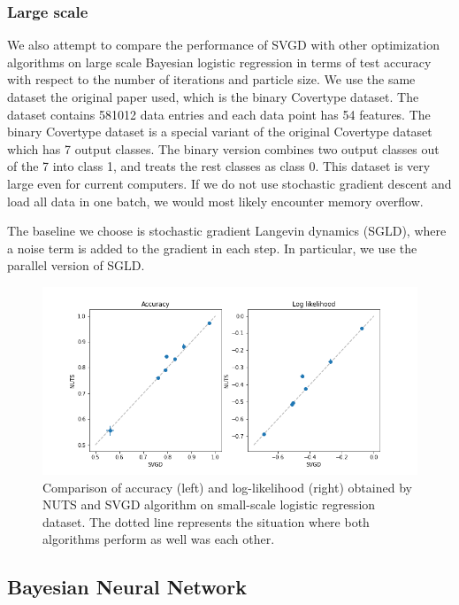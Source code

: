 \subsubsection{Large scale}
We also attempt to compare the performance of SVGD with other optimization algorithms on large scale Bayesian logistic regression in terms of test accuracy with respect to the number of iterations and particle size. We use the same dataset the original paper used, which is the binary Covertype dataset. The dataset contains 581012 data entries and each data point has 54 features. The binary Covertype dataset is a special variant of the original Covertype dataset which has 7 output classes. The binary version combines two output classes out of the 7 into class 1, and treats the rest classes as class 0. This dataset is very large even for current computers. If we do not use stochastic gradient descent and load all data in one batch, we would most likely encounter memory overflow. 

The baseline we choose is stochastic gradient Langevin dynamics (SGLD), where a noise term is added to the gradient in each step. In particular, we use the parallel version of SGLD. 



\begin{figure}[h]
    \centering
    \includegraphics[width=\textwidth]{figs/logistic_svgd_nuts.png}
    \caption{Comparison of accuracy (left) and log-likelihood (right) obtained by NUTS and SVGD algorithm on small-scale logistic regression dataset. The dotted line represents the situation where both algorithms perform as well was each other.}
    \label{fig:logist_small}
\end{figure}

\subsection{Bayesian Neural Network}

